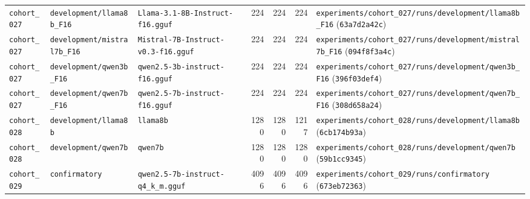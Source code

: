 {\begin{longtable}{@{}>{\raggedright\arraybackslash}p{1.5cm}>{\raggedright\arraybackslash}p{2.7cm}>{\raggedright\arraybackslash}p{3.2cm}rrr>{\raggedright\arraybackslash}p{4.2cm}@{}}
\texttt{cohort\_027} & \texttt{development/\allowbreak{}llama8b\_F16} & \texttt{Llama-\allowbreak{}3.1-\allowbreak{}8B-\allowbreak{}Instruct-\allowbreak{}f16.gguf} & 224 & 224 & 224 & \texttt{experiments/\allowbreak{}cohort\_027/\allowbreak{}runs/\allowbreak{}development/\allowbreak{}llama8b\_F16} (\texttt{63a7d2a42c}) \\
\texttt{cohort\_027} & \texttt{development/\allowbreak{}mistral7b\_F16} & \texttt{Mistral-\allowbreak{}7B-\allowbreak{}Instruct-\allowbreak{}v0.3-\allowbreak{}f16.gguf} & 224 & 224 & 224 & \texttt{experiments/\allowbreak{}cohort\_027/\allowbreak{}runs/\allowbreak{}development/\allowbreak{}mistral7b\_F16} (\texttt{094f8f3a4c}) \\
\texttt{cohort\_027} & \texttt{development/\allowbreak{}qwen3b\_F16} & \texttt{qwen2.5-\allowbreak{}3b-\allowbreak{}instruct-\allowbreak{}f16.gguf} & 224 & 224 & 224 & \texttt{experiments/\allowbreak{}cohort\_027/\allowbreak{}runs/\allowbreak{}development/\allowbreak{}qwen3b\_F16} (\texttt{396f03def4}) \\
\texttt{cohort\_027} & \texttt{development/\allowbreak{}qwen7b\_F16} & \texttt{qwen2.5-\allowbreak{}7b-\allowbreak{}instruct-\allowbreak{}f16.gguf} & 224 & 224 & 224 & \texttt{experiments/\allowbreak{}cohort\_027/\allowbreak{}runs/\allowbreak{}development/\allowbreak{}qwen7b\_F16} (\texttt{308d658a24}) \\
\texttt{cohort\_028} & \texttt{development/\allowbreak{}llama8b} & \texttt{llama8b} & 1280 & 1280 & 1217 & \texttt{experiments/\allowbreak{}cohort\_028/\allowbreak{}runs/\allowbreak{}development/\allowbreak{}llama8b} (\texttt{6cb174b93a}) \\
\texttt{cohort\_028} & \texttt{development/\allowbreak{}qwen7b} & \texttt{qwen7b} & 1280 & 1280 & 1280 & \texttt{experiments/\allowbreak{}cohort\_028/\allowbreak{}runs/\allowbreak{}development/\allowbreak{}qwen7b} (\texttt{59b1cc9345}) \\
\texttt{cohort\_029} & \texttt{confirmatory} & \texttt{qwen2.5-\allowbreak{}7b-\allowbreak{}instruct-\allowbreak{}q4\_k\_m.gguf} & 4096 & 4096 & 4096 & \texttt{experiments/\allowbreak{}cohort\_029/\allowbreak{}runs/\allowbreak{}confirmatory} (\texttt{673eb72363}) \\
\end{longtable}
}